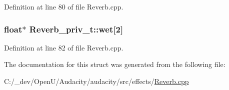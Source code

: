 Definition at line 80 of file Reverb.\+cpp.

\subsubsection[{\texorpdfstring{wet}{wet}}]{\setlength{\rightskip}{0pt plus 5cm}float$\ast$ Reverb\+\_\+priv\+\_\+t\+::wet\mbox{[}2\mbox{]}}\hypertarget{struct_reverb__priv__t_a2acb868e69006bdad0a970952b03d92b}{}\label{struct_reverb__priv__t_a2acb868e69006bdad0a970952b03d92b}


Definition at line 82 of file Reverb.\+cpp.



The documentation for this struct was generated from the following file\+:\begin{DoxyCompactItemize}
\item 
C\+:/\+\_\+dev/\+Open\+U/\+Audacity/audacity/src/effects/\hyperlink{_reverb_8cpp}{Reverb.\+cpp}\end{DoxyCompactItemize}
